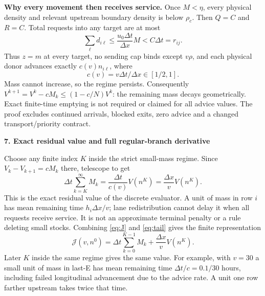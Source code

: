 \documentclass[10pt,a4paper]{article}
\newcommand{\head}[1]{\par\medskip\textbf{#1}\par}
\begin{document}
\textbf{Why every movement then receives service.} Once $M<\eta$, every
physical density and relevant upstream boundary density is below $\rho_c$.
Then $Q=C$ and $R=C$. Total requests into any target are at most
\begin{equation}
 \sum_\ell d_{i\ell}\leq\frac{u_0\Delta t}{\Delta x}M
 < C\Delta t=r_{ij}. \label{eq:tailspace}
\end{equation}
Thus $z=m$ at every target, no sending cap binds except $v\rho$, and each
physical donor advances exactly $c(v)n_{i\ell}$, where
\begin{equation}
 c(v)=v\Delta t/\Delta x\in[1/2,1].
\end{equation}
Mass cannot increase, so the regime persists. Consequently
$V^{k+1}=V^k-cM_k\leq(1-c/N)V^k$: the remaining mass decays geometrically.
Exact finite-time emptying is not required or claimed for all advice values.
The proof excludes continued arrivals, blocked exits, zero advice and a
changed transport/priority contract.

\newpage
\head{7. Exact residual value and full regular-branch derivative}
Choose any finite index $K$ inside the strict small-mass regime. Since
$V_k-V_{k+1}=cM_k$ there, telescope to get
\begin{equation}
 \Delta t\sum_{k=K}^{\infty}M_k
 =\frac{\Delta t}{c(v)}V(n^K)=\frac{\Delta x}{v}V(n^K).
 \label{eq:tail}
\end{equation}
This is the exact residual value of the discrete evaluator. A unit of mass
in row $i$ has mean remaining time $h_i\Delta x/v$; lane redistribution
cannot delay it when all requests receive service. It is not an approximate
terminal penalty or a rule deleting small stocks. Combining
\eqref{eq:J} and \eqref{eq:tail} gives the finite representation
\begin{equation}
 \mathcal J(v,n^0)=\Delta t\sum_{k=0}^{K-1}M_k+
                     \frac{\Delta x}{v}V(n^K). \label{eq:Jfinite}
\end{equation}
Later $K$ inside the same regime gives the same value. For example, with
$v=30$ a small unit of mass in last-E has mean remaining time
$\Delta t/c=0.1/30$ hours, including failed longitudinal advancement due to
the advice rate. A unit one row farther upstream takes twice that time.
\end{document}
